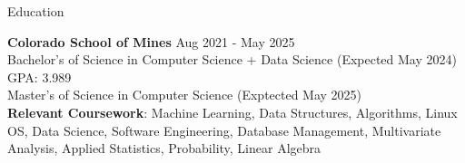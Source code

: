 \documentclass{resume} %
\begin{document}
\vspace{-10pt}

\begin{rSection}{Education}

{\bf Colorado School of Mines} \hfill {Aug 2021 - May 2025}\\
Bachelor's of Science in Computer Science + Data Science (Expected May 2024) \hfill {GPA: 3.989}\\
Master's of Science in Computer Science (Exptected May 2025)\\
\textbf{Relevant Coursework}: Machine Learning, Data Structures, Algorithms, Linux OS, Data Science, Software Engineering, Database Management, Multivariate Analysis, Applied Statistics, Probability, Linear Algebra



\end{rSection}
\vspace{-6pt}
\end{document}
